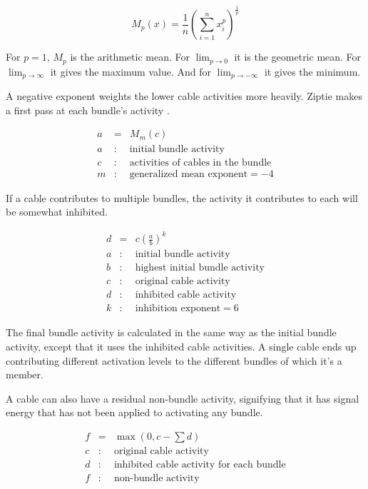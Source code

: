\documentclass[oneside,twocolumn]{article}
\begin{document}
\begin{equation*}
M_p(x) = {\frac{1}{n}\left( \sum_{i=1}^{n}x_i^p  \right)}^{\frac{1}{p}} 
\end{equation*}

For $p = 1$, $M_p$ is the arithmetic mean. For $\lim_{p \to 0}$ it is the geometric mean. For $\lim_{p \to \infty}$ it gives the maximum value. And for   $\lim_{p \to -\infty}$ it gives the minimum.

A negative exponent weights the lower cable activities more heavily. Ziptie makes a first pass at each bundle's activity .

\begin{eqnarray*}
a &=& M_m(c)\\ 
a &:& \mbox{initial bundle activity}\\ 
c &:& \mbox{activities of cables in the bundle}\\
m &:& \mbox{generalized mean exponent} = -4
\end{eqnarray*}

If a cable contributes to multiple bundles, the activity it contributes to each will be somewhat inhibited.

\begin{eqnarray*}
d &=& c \left( \frac{a}{b} \right) ^ k\\ 
a &:& \mbox{initial bundle activity}\\ 
b &:& \mbox{highest initial bundle activity}\\ 
c &:& \mbox{original cable activity}\\
d &:& \mbox{inhibited cable activity}\\
k &:& \mbox{inhibition exponent} = 6
\end{eqnarray*}

The final bundle activity is calculated in the same way as the initial bundle activity, except that it uses the inhibited cable activities. A single cable ends up contributing different activation levels to the different bundles of which it's a member.

A cable can also have a residual non-bundle activity, signifying that it has signal energy that has not been applied to activating any bundle.

\begin{eqnarray*}
f &=& \max \left (0, c - \sum d \right)\\ 
c &:& \mbox{original cable activity}\\
d &:& \mbox{inhibited cable activity for each bundle}\\
f &:& \mbox{non-bundle activity}
\end{eqnarray*}
\end{document}
